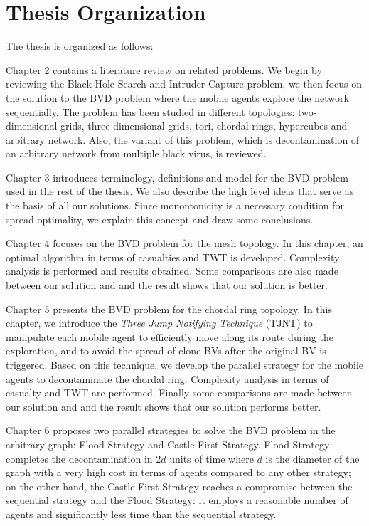 
\section{Thesis Organization} 

The thesis is organized as follows:

Chapter 2 contains a literature review on related problems. We begin by reviewing the Black Hole Search and Intruder Capture problem, we then focus on the solution to the  BVD problem where the mobile agents explore the network sequentially. The problem has been studied in different topologies: two-dimensional grids, three-dimensional grids, tori, chordal rings, hypercubes and arbitrary network. Also, the variant of this problem, which is decontamination of an arbitrary network from multiple black virus, is   reviewed. 

Chapter 3 introduces terminology, definitions and model for the BVD problem used in the rest of the thesis.   We also describe the high level ideas that serve as the basis of all our solutions. Since monontonicity is a necessary condition for spread optimality, we explain this concept  and draw some  conclusions.

Chapter 4 focuses on the BVD problem for the mesh topology. In this chapter, an optimal algorithm in terms of casualties and TWT is developed. Complexity analysis  is performed and results obtained. Some comparisons  are also made between our solution and \cite{cai} and the result shows that our solution is better.

Chapter 5 presents the BVD problem for the chordal ring topology. In this chapter, we introduce the {\em Three Jump Notifying Technique} (TJNT) to manipulate each mobile agent to efficiently move along its route during the exploration,   and to avoid  the spread of clone BVs after the original BV is triggered. Based on this technique, we develop the parallel strategy for the mobile agents to decontaminate the chordal ring. Complexity analysis in terms of casualty and TWT are performed. Finally some comparisons are made between our solution and \cite{alotaibi} and the result shows that our solution performs better.

 
Chapter 6 proposes two parallel strategies to solve the BVD problem in the arbitrary graph: {\sc Flood} Strategy and {\sc Castle-First} Strategy. {\sc Flood} Strategy completes the decontamination in $2d$ units of time where $d$ is the diameter of the graph with a very high  cost  in terms of agents compared to any other   strategy; on the other hand,    the {\sc Castle-First} Strategy reaches a compromise between the sequential strategy and the {\sc Flood} Strategy: it employs  a reasonable number of agents and significantly less time than the sequential strategy.

